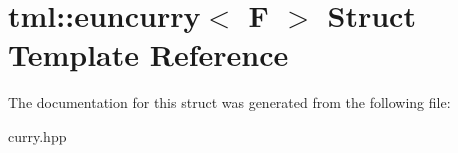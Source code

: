 \hypertarget{structtml_1_1euncurry}{\section{tml\+:\+:euncurry$<$ F $>$ Struct Template Reference}
\label{structtml_1_1euncurry}
}


The documentation for this struct was generated from the following file\+:\begin{DoxyCompactItemize}
\item 
curry.\+hpp\end{DoxyCompactItemize}
